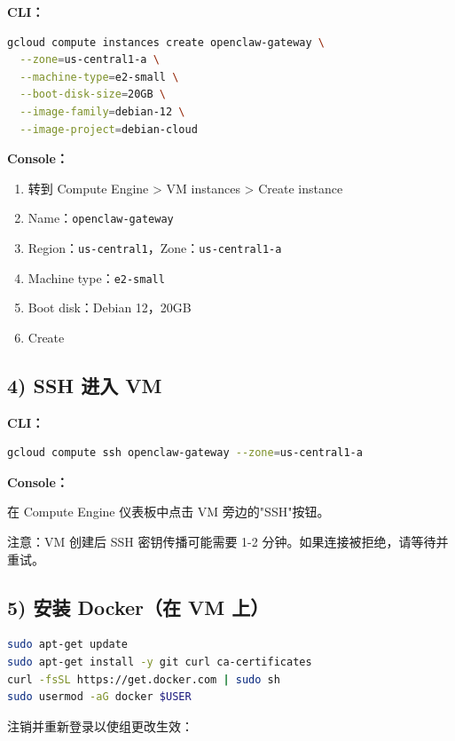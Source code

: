 \textbf{CLI：}

\begin{lstlisting}[language=bash]
gcloud compute instances create openclaw-gateway \
  --zone=us-central1-a \
  --machine-type=e2-small \
  --boot-disk-size=20GB \
  --image-family=debian-12 \
  --image-project=debian-cloud
\end{lstlisting}


\textbf{Console：}

\begin{enumerate}
  \item 转到 Compute Engine > VM instances > Create instance
  \item Name：\texttt{openclaw-gateway}
  \item Region：\texttt{us-central1}，Zone：\texttt{us-central1-a}
  \item Machine type：\texttt{e2-small}
  \item Boot disk：Debian 12，20GB
  \item Create
\end{enumerate}


\hrulefill


\subsection{4) SSH 进入 VM}


\textbf{CLI：}

\begin{lstlisting}[language=bash]
gcloud compute ssh openclaw-gateway --zone=us-central1-a
\end{lstlisting}


\textbf{Console：}

在 Compute Engine 仪表板中点击 VM 旁边的"SSH"按钮。

注意：VM 创建后 SSH 密钥传播可能需要 1-2 分钟。如果连接被拒绝，请等待并重试。

\hrulefill


\subsection{5) 安装 Docker（在 VM 上）}


\begin{lstlisting}[language=bash]
sudo apt-get update
sudo apt-get install -y git curl ca-certificates
curl -fsSL https://get.docker.com | sudo sh
sudo usermod -aG docker $USER
\end{lstlisting}


注销并重新登录以使组更改生效：


